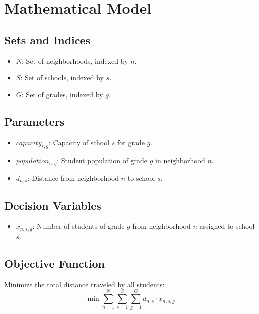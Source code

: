 \documentclass{article}
\begin{document}
\section*{Mathematical Model}

\subsection*{Sets and Indices}
\begin{itemize}
    \item $N$: Set of neighborhoods, indexed by $n$.
    \item $S$: Set of schools, indexed by $s$.
    \item $G$: Set of grades, indexed by $g$.
\end{itemize}

\subsection*{Parameters}
\begin{itemize}
    \item $capacity_{s,g}$: Capacity of school $s$ for grade $g$.
    \item $population_{n,g}$: Student population of grade $g$ in neighborhood $n$.
    \item $d_{n,s}$: Distance from neighborhood $n$ to school $s$.
\end{itemize}

\subsection*{Decision Variables}
\begin{itemize}
    \item $x_{n,s,g}$: Number of students of grade $g$ from neighborhood $n$ assigned to school $s$.
\end{itemize}

\subsection*{Objective Function}
Minimize the total distance traveled by all students:
\[
\min \sum_{n=1}^{N} \sum_{s=1}^{S} \sum_{g=1}^{G} d_{n,s} \cdot x_{n,s,g}
\]
\end{document}
